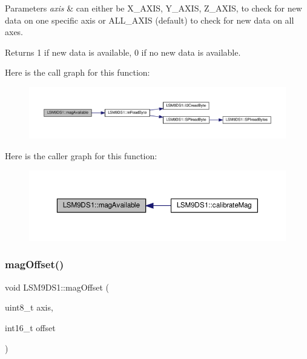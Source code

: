 \begin{DoxyParams}{Parameters}
{\em axis} & can either be X\+\_\+\+A\+X\+IS, Y\+\_\+\+A\+X\+IS, Z\+\_\+\+A\+X\+IS, to check for new data on one specific axis or A\+L\+L\+\_\+\+A\+X\+IS (default) to check for new data on all axes. \\
\hline
\end{DoxyParams}
\begin{DoxyReturn}{Returns}
1 if new data is available, 0 if no new data is available. 
\end{DoxyReturn}
Here is the call graph for this function\+:
\nopagebreak
\begin{figure}[H]
\begin{center}
\leavevmode
\includegraphics[width=350pt]{classLSM9DS1_a85afd29e95bead7b3f0083a9a235d1df_cgraph}
\end{center}
\end{figure}
Here is the caller graph for this function\+:
\nopagebreak
\begin{figure}[H]
\begin{center}
\leavevmode
\includegraphics[width=350pt]{classLSM9DS1_a85afd29e95bead7b3f0083a9a235d1df_icgraph}
\end{center}
\end{figure}
\mbox{\label{classLSM9DS1_a0d461614bd058b082c94481dc916c18b}} 
\subsubsection{\texorpdfstring{mag\+Offset()}{magOffset()}}
{\footnotesize\ttfamily void L\+S\+M9\+D\+S1\+::mag\+Offset (\begin{DoxyParamCaption}\item[{uint8\+\_\+t}]{axis,  }\item[{int16\+\_\+t}]{offset }\end{DoxyParamCaption})}



